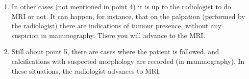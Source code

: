 \begin{enumerate}
\item In other cases (not mentioned in point 4) it is up to the radiologist to do MRI or not. It can happen, for instance, that on the palpation (performed by the radiologist) there are indications of tumour presence, without any suspicion in mammography. There you will advance to the MRI.

\item Still about point 5, there are cases where the patient is followed, and calcifications with suspected morphology are recorded (in mammography). In these situations, the radiologist advances to MRI.

\end{enumerate}

\hfill
















